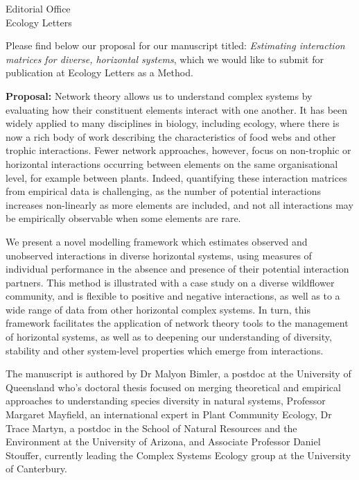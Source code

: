 \documentclass{letter}
\begin{document}
\begin{letter}{Editorial Office \\
Ecology Letters}

\opening{}

Please find below our proposal for our manuscript titled: \textit{Estimating interaction matrices for diverse, horizontal systems}, which we would like to submit for publication at Ecology Letters as a Method. 

\textbf{Proposal:}
Network theory allows us to understand complex systems by evaluating how their constituent elements interact with one another. It has been widely applied to many disciplines in biology, including ecology, where there is now a rich body of work describing the characteristics of food webs and other trophic interactions. Fewer network approaches, however, focus on non-trophic or horizontal interactions occurring between elements on the same organisational level, for example between plants. Indeed, quantifying these interaction matrices from empirical data is challenging, as the number of potential interactions increases non-linearly as more elements are included, and not all interactions may be empirically observable when some elements are rare. 

We present a novel modelling framework which estimates observed and unobserved interactions in diverse horizontal systems, using measures of individual performance in the absence and presence of their potential interaction partners. This method is illustrated with a case study on a diverse wildflower community, and is flexible to positive and negative interactions, as well as to a wide range of data from other horizontal complex systems. In turn, this framework facilitates the application of network theory tools to the management of horizontal systems, as well as to deepening our understanding of diversity, stability and other system-level properties which emerge from interactions. 

The manuscript is authored by Dr Malyon Bimler, a postdoc at the University of Queensland who's doctoral thesis focused on merging theoretical and empirical approaches to understanding species diversity in natural systems, Professor Margaret Mayfield, an international expert in Plant Community Ecology, Dr Trace Martyn, a postdoc in the School of Natural Resources and the Environment at the University of Arizona, and Associate Professor Daniel Stouffer, currently leading the Complex Systems Ecology group at the University of Canterbury.


\end{letter}
\end{document}
